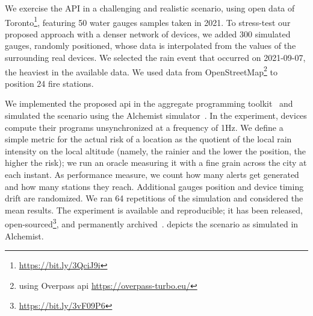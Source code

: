 We exercise the API in a challenging and realistic scenario,
using open data %
 of Toronto\footnote{\url{https://bit.ly/3QciJ9i}},
featuring 50 water gauges samples taken in 2021.
%
To stress-test our proposed approach with a denser network of devices,
we added 300 simulated gauges,
randomly positioned,
whose data is interpolated from the values of the surrounding real devices.
%
We selected the rain event that occurred on 2021-09-07,
the heaviest in the available data.
%
We used data from OpenStreetMap\footnote{using Overpass \ac{api} \url{https://overpass-turbo.eu/}} to position 24 fire stations.

We implemented the proposed \ac{api} in the \scafi{} aggregate programming toolkit~\cite{DBLP:conf/isola/CasadeiVAD20}
and simulated the scenario using the Alchemist simulator~\cite{Pianini2013}.
%
In the experiment, devices compute their programs unsynchronized at a frequency of 1Hz.
%
We define a simple metric for the actual risk of a location as the quotient of the local rain intensity on the local altitude
(namely, the rainier and the lower the position, the higher the risk);
we run an oracle measuring it with a fine grain across the city at each instant.
%
As performance measure, we count how many alerts get generated and how many stations they reach.
%
Additional gauges position and device timing drift are randomized.
%
We ran 64 repetitions of the simulation and considered the mean results.
%
The experiment is available and reproducible;
it has been released, open-sourced\footnote{\url{https://bit.ly/3vF09P6}},
and permanently archived~\cite{simulation-doi}. %
%
 depicts the scenario as simulated in Alchemist.

